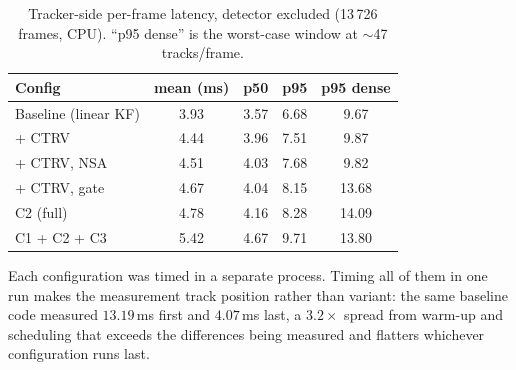 \begin{table}[h]
  \centering
  \caption{Tracker-side per-frame latency, detector excluded
           (13\,726 frames, CPU). ``p95 dense'' is the worst-case
           window at $\sim$47 tracks/frame.}
  \label{tab:runtime}
  \begin{tabular}{lcccc}
    \toprule
    Config & mean (ms) & p50 & p95 & p95 dense \\
    \midrule
    Baseline (linear KF)     & 3.93 & 3.57 & 6.68 & 9.67 \\
    \quad + CTRV             & 4.44 & 3.96 & 7.51 & 9.87 \\
    \quad + CTRV, NSA        & 4.51 & 4.03 & 7.68 & 9.82 \\
    \quad + CTRV, gate       & 4.67 & 4.04 & 8.15 & 13.68 \\
    C2 (full)                & 4.78 & 4.16 & 8.28 & 14.09 \\
    C1 + C2 + C3             & 5.42 & 4.67 & 9.71 & 13.80 \\
    \bottomrule
  \end{tabular}
\end{table}

Each configuration was timed in a separate process.
Timing all of them in one run makes the measurement track position
rather than variant: the same baseline code measured $13.19$\,ms first
and $4.07$\,ms last, a $3.2\times$ spread from warm-up and scheduling
that exceeds the differences being measured and flatters whichever
configuration runs last.
